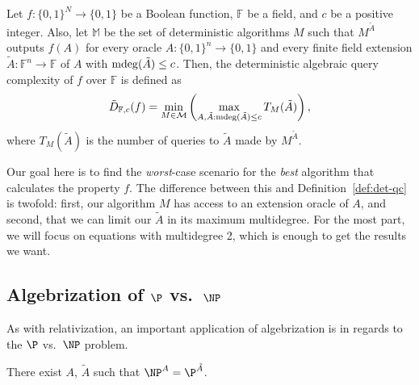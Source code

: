 \begin{defn}[{\cite[Def. 4.1]{AW09}}]\label{def:aqc}
  Let $f: \{0, 1\}^{N} \rightarrow \{0, 1\}$ be a Boolean function, $\mathbb{F}$ be a
  field, and $c$ be a positive integer. Also, let $\mathbb{M}$ be the set of
  deterministic algorithms $M$ such that $M^{\tilde{A}}$ outputs $f(A)$ for
  every oracle $A: \{0, 1\}^{n} \rightarrow \{0, 1\}$ and every finite field extension
  $\tilde{A}: \mathbb{F}^{n} \rightarrow \mathbb{F}$ of $A$ with $\operatorname{mdeg}(\tilde{A}) \le c$.
  Then, the deterministic algebraic query complexity of $f$ over $\mathbb{F}$ is
  defined as
  \begin{equation}
    \tilde{D}_{\mathbb{F}, c}(f) = \min_{M \in \mathcal{M}}\left(
      \max_{A, \tilde{A}: \operatorname{mdeg}(\tilde{A}) \le c}T_{M}(\tilde{A})
    \right),
  \end{equation}
  where $T_{M}(\tilde{A})$ is the number of queries to $\tilde{A}$ made by
  $M^{\tilde{A}}$.
\end{defn}

Our goal here is to find the \emph{worst}-case scenario for the \emph{best}
algorithm that calculates the property $f$. The difference between this and
Definition~\ref{def:det-qc} is twofold: first, our algorithm $M$ has access to
an extension oracle of $A$, and second, that we can limit our $\tilde{A}$ in
its maximum multidegree. For the most part, we will focus on equations with
multidegree 2, which is enough to get the results we want.


\subsection{Algebrization of $\P$ vs.\ $\NP$}\label{sec:alg-p-np}

As with relativization, an important application of algebrization is in regards
to the $\P$ vs.\ $\NP$ problem.

\begin{thm}[{\cite[Theorem 5.1]{AW09}}]\label{thm:p-np-alg}
  There exist $A$, $\tilde{A}$ such that $\NP^{A} = \P^{\tilde{A}}$.
\end{thm}

